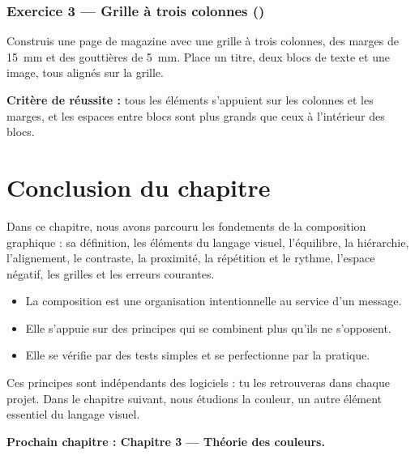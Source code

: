 \subsubsection*{Exercice 3 --- Grille à trois colonnes ()}

Construis une page de magazine avec une grille à trois colonnes, des marges de 15~mm et des gouttières de 5~mm. Place un titre, deux blocs de texte et une image, tous alignés sur la grille.

\textbf{Critère de réussite :} tous les éléments s'appuient sur les colonnes et les marges, et les espaces entre blocs sont plus grands que ceux à l'intérieur des blocs.

\section*{Conclusion du chapitre}

Dans ce chapitre, nous avons parcouru les fondements de la composition graphique : sa définition, les éléments du langage visuel, l'équilibre, la hiérarchie, l'alignement, le contraste, la proximité, la répétition et le rythme, l'espace négatif, les grilles et les erreurs courantes.

\begin{itemize}
  \item La composition est une organisation intentionnelle au service d'un message.
  \item Elle s'appuie sur des principes qui se combinent plus qu'ils ne s'opposent.
  \item Elle se vérifie par des tests simples et se perfectionne par la pratique.
\end{itemize}

Ces principes sont indépendants des logiciels : tu les retrouveras dans chaque projet. Dans le chapitre suivant, nous étudions la couleur, un autre élément essentiel du langage visuel.

\vspace{1em}

\begin{center}
\textbf{Prochain chapitre : Chapitre 3 --- Théorie des couleurs.}
\end{center}
